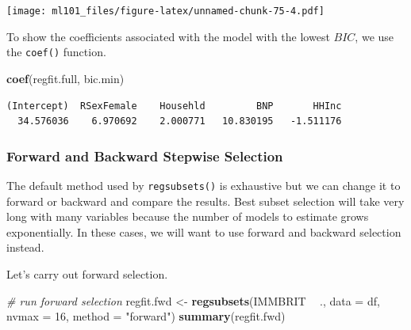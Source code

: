 \documentclass[]{article}
\newenvironment{Shaded}{\begin{snugshade}}{\end{snugshade}}
\newcommand{\CommentTok}[1]{\textcolor[rgb]{0.56,0.35,0.01}{\textit{#1}}}
\newcommand{\DataTypeTok}[1]{\textcolor[rgb]{0.13,0.29,0.53}{#1}}
\newcommand{\DecValTok}[1]{\textcolor[rgb]{0.00,0.00,0.81}{#1}}
\newcommand{\KeywordTok}[1]{\textcolor[rgb]{0.13,0.29,0.53}{\textbf{#1}}}
\newcommand{\NormalTok}[1]{#1}
\newcommand{\OperatorTok}[1]{\textcolor[rgb]{0.81,0.36,0.00}{\textbf{#1}}}
\newcommand{\StringTok}[1]{\textcolor[rgb]{0.31,0.60,0.02}{#1}}
\begin{document}
\texttt{[image: ml101\_files/figure-latex/unnamed-chunk-75-4.pdf]}

To show the coefficients associated with the model with the lowest \(BIC\), we use the \texttt{coef()} function.

\begin{Shaded}
\begin{Highlighting}[]
\KeywordTok{coef}\NormalTok{(regfit.full, bic.min)}
\end{Highlighting}
\end{Shaded}

\begin{verbatim}
(Intercept)  RSexFemale    Househld         BNP       HHInc 
  34.576036    6.970692    2.000771   10.830195   -1.511176 
\end{verbatim}

\hypertarget{forward-and-backward-stepwise-selection}{%
\subsubsection{Forward and Backward Stepwise Selection}\label{forward-and-backward-stepwise-selection}}

The default method used by \texttt{regsubsets()} is exhaustive but we can change it to forward or backward and compare the results. Best subset selection will take very long with many variables because the number of models to estimate grows exponentially. In these cases, we will want to use forward and backward selection instead.

Let's carry out forward selection.

\begin{Shaded}
\begin{Highlighting}[]
\CommentTok{# run forward selection}
\NormalTok{regfit.fwd <-}\StringTok{ }\KeywordTok{regsubsets}\NormalTok{(IMMBRIT }\OperatorTok{~}\StringTok{ }\NormalTok{., }\DataTypeTok{data =}\NormalTok{ df, }\DataTypeTok{nvmax =} \DecValTok{16}\NormalTok{, }\DataTypeTok{method =} \StringTok{"forward"}\NormalTok{)}
\KeywordTok{summary}\NormalTok{(regfit.fwd)}
\end{Highlighting}
\end{Shaded}
\end{document}
